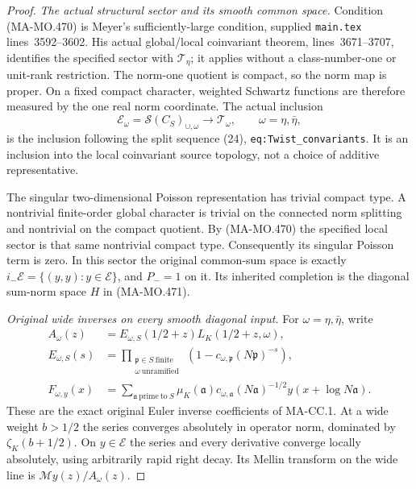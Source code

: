 \begin{proof}
\emph{The actual structural sector and its smooth common space.}
Condition (MA-MO.470) is Meyer's sufficiently-large condition,
supplied \texttt{main.tex} lines~3592--3602. His actual
global/local coinvariant theorem, lines~3671--3707, identifies
the specified sector with \(\mathcal T_\eta\); it applies
without a class-number-one or unit-rank restriction. The
norm-one quotient is compact, so the norm map is proper.
On a fixed compact character, weighted Schwartz functions
are therefore measured by the one real norm coordinate.
The actual inclusion
\[
        \mathcal E_\omega
          =\mathscr S(C_S)_{\cup,\omega}
                          \longrightarrow\mathcal T_\omega,
                   \qquad\omega=\eta,\bar\eta,
 \tag{MA-MO.476}
\]
is the inclusion following the split sequence (24),
\texttt{eq:Twist\_convariants}. It is an inclusion into
the local coinvariant source topology, not a choice of
additive representative.

The singular two-dimensional Poisson representation has
trivial compact type. A nontrivial finite-order global
character is trivial on the connected norm splitting and
nontrivial on the compact quotient. By (MA-MO.470) the
specified local sector is that same nontrivial compact type.
Consequently its singular Poisson term is zero. In this
sector the original common-sum space is exactly
\(i_-\mathcal E=\{(y,y):y\in\mathcal E\}\), and
\(P_-=1\) on it. Its inherited completion is the diagonal
sum-norm space \(H\) in (MA-MO.471).

\emph{Original wide inverses on every smooth diagonal input.}
For \(\omega=\eta,\bar\eta\), write
\[
 \begin{aligned}
 A_\omega(z)&=E_{\omega,S}(1/2+z)L_K(1/2+z,\omega),\\
 E_{\omega,S}(s)&=\prod_{\substack{\mathfrak p\in S\ \mathrm{finite}\\
                                  \omega\ \mathrm{unramified}\ }}
                         (1-c_{\omega,\mathfrak p}(N\mathfrak p)^{-s}),\\
 F_{\omega,y}(x)&=
   \sum_{\mathfrak a\ \mathrm{prime\ to}\ S}
        \mu_K(\mathfrak a)c_{\omega,\mathfrak a}
        (N\mathfrak a)^{-1/2}y(x+\log N\mathfrak a).
 \end{aligned}
 \tag{MA-MO.477}
\]
These are the exact original Euler inverse coefficients of
MA-CC.1. At a wide weight \(b>1/2\) the series converges
absolutely in operator norm, dominated by
\(\zeta_K(b+1/2)\). On \(y\in\mathcal E\) the series
and every derivative converge locally absolutely, using
arbitrarily rapid right decay. Its Mellin transform on
the wide line is \(\mathcal My(z)/A_\omega(z)\).


\end{proof}
